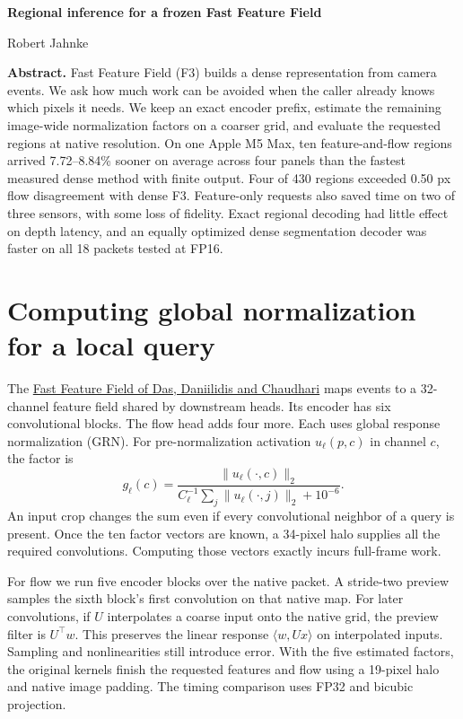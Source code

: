\documentclass[11pt,letterpaper]{article}
\begin{document}
{\LARGE\bfseries\color{ink}Regional inference for a frozen Fast Feature Field\par}
{\large Robert Jahnke}\par
\textbf{Abstract.}
Fast Feature Field (F3) builds a dense representation from camera events. We ask how much work can be avoided when the caller already knows which pixels it needs. We keep an exact encoder prefix, estimate the remaining image-wide normalization factors on a coarser grid, and evaluate the requested regions at native resolution. On one Apple M5 Max, ten feature-and-flow regions arrived 7.72--8.84\% sooner on average across four panels than the fastest measured dense method with finite output. Four of 430 regions exceeded 0.50 px flow disagreement with dense F3. Feature-only requests also saved time on two of three sensors, with some loss of fidelity. Exact regional decoding had little effect on depth latency, and an equally optimized dense segmentation decoder was faster on all 18 packets tested at FP16.

\section{Computing global normalization for a local query}
The \href{https://arxiv.org/html/2509.25146v2}{Fast Feature Field of Das, Daniilidis and Chaudhari} maps events to a 32-channel feature field shared by downstream heads. Its encoder has six convolutional blocks. The flow head adds four more. Each uses global response normalization (GRN). For pre-normalization activation $u_\ell(p,c)$ in channel $c$, the factor is
\[
 g_\ell(c)=\frac{\|u_\ell(\cdot,c)\|_2}
                  {C_\ell^{-1}\sum_j\|u_\ell(\cdot,j)\|_2+10^{-6}}.
\]
An input crop changes the sum even if every convolutional neighbor of a query is present. Once the ten factor vectors are known, a 34-pixel halo supplies all the required convolutions. Computing those vectors exactly incurs full-frame work.

For flow we run five encoder blocks over the native packet. A stride-two preview samples the sixth block's first convolution on that native map. For later convolutions, if $U$ interpolates a coarse input onto the native grid, the preview filter is $U^\top w$. This preserves the linear response $\langle w,Ux\rangle$ on interpolated inputs. Sampling and nonlinearities still introduce error. With the five estimated factors, the original kernels finish the requested features and flow using a 19-pixel halo and native image padding. The timing comparison uses FP32 and bicubic projection.
\end{document}
